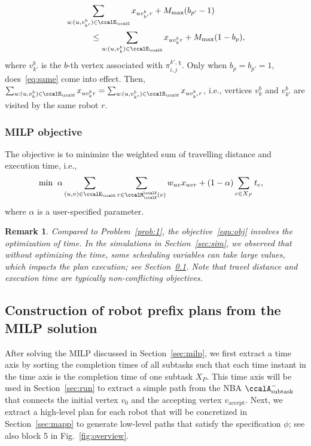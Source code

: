 \documentclass[Afour,sageh,times]{sagej}
\newtheorem{rem}[thm]{Remark}
\newcommand{\auto}[1]{\ccalA_{\textup{#1}}}
\newcommand{\aap}[4]{\mathcal{\pi}_{{#1},{#2}}^{#3,#4}}
\begin{document}
{{{\begin{subequations}
\begin{align}
    & \sum_{u:(u, v_{k'}^b) \in \ccalE_\ccalG} x_{u v_{k'}^b r} + M_{\text{max}} (b_{p'} - 1) \nonumber \\& \quad\quad\quad \leq \sum_{u:(u, v_{k}^b) \in \ccalE_\ccalG} x_{u v_{k}^b r} + M_{\text{max}}(1 - b_{p}),
  \end{align}
\end{subequations}
\endgroup
where $v_{k'}^b$ is the $b$-th vertex associated with $\aap{i}{j}{k'}{\chi}$. Only when $b_p = b_{p'}=1$, does~\eqref{eq:same} come into effect. Then, $\sum\nolimits_{u:(u, v_k^b) \in \ccalE_\ccalG} x_{u v_k^b r} = \sum\nolimits_{u:(u, v_{k'}^b) \in \ccalE_\ccalG} x_{u v_{k'}^b r} $, i.e., vertices $v_k^b$ and $v_{k'}^b$ are visited by the same robot $r$.

\subsubsection{MILP objective}The objective is to minimize the weighted sum of travelling distance and execution time, i.e.,
\begingroup\makeatletter\def\f@size{10}\check@mathfonts
\def\maketag@@@#1{\hbox{\m@th\normalsize\normalfont#1}}%
\begin{align}\label{equ:obj}
  \min \; \;&  \alpha \sum_{(u,v)\in \ccalE_\ccalG}  \sum_{r \in \ccalM^\ccalV_{\ccalK}(v)} w_{uv} x_{uvr} +  (1 - \alpha) \sum_{e\in X_P} t_e,
\end{align}
 \endgroup
  where $\alpha$ is a user-specified parameter.
  \begin{rem}
   Compared to Problem~\ref{prob:1}, the objective~\eqref{equ:obj} involves the optimization of time. In the simulations in Section~\ref{sec:sim}, we observed that without optimizing the time, some scheduling variables can take large values, which impacts the plan execution; see Section~\ref{sec:path}. Note that travel distance and execution time are typically non-conflicting objectives.

  \end{rem}
\subsection{Construction of robot prefix plans from the MILP solution}\label{sec:path}
After solving the MILP discussed in Section~\ref{sec:milp}, we first extract a time axis by sorting the completion times of all subtasks such that each time instant in the time axis is the completion time of one subtask $X_P$. This time axis  will be used in Section~\ref{sec:run} to extract a simple path from the NBA $\auto{subtask}^-$ that connects the initial vertex $v_0$ and the accepting vertex $v_\text{accept}$. Next, we extract a high-level plan for each robot  that will be concretized in Section~\ref{sec:mapp} to generate low-level paths that satisfy the specification $\phi$; see also block 5 in Fig.~\ref{fig:overview}.


}}}
\end{document}
